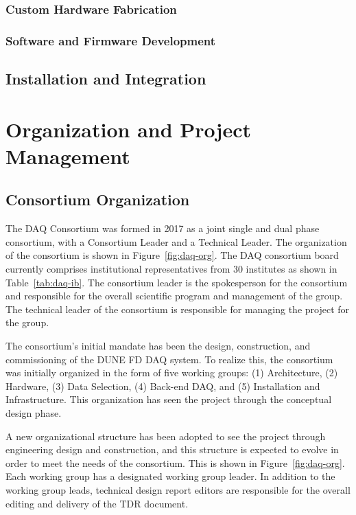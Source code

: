 \subsubsection{Custom Hardware Fabrication}

\subsubsection{Software and Firmware Development}

\subsection{Installation and Integration}

\section{Organization and Project Management}
\label{sec:daq:organization}

\subsection{Consortium Organization}

The DAQ Consortium was formed in 2017 as a joint single and dual phase
consortium, with a Consortium Leader and a Technical Leader.
The organization of the consortium is shown in Figure~\ref{fig:daq-org}.
The DAQ consortium board currently comprises institutional representatives from
30 institutes as shown in Table~\ref{tab:daq-ib}.
The consortium leader is the spokesperson for the consortium and responsible for
the overall scientific program and management of the group.
The technical leader of the consortium is responsible for managing the project
for the group.

The consortium's initial mandate has been the design, construction, and
commissioning of the DUNE FD DAQ system.
To realize this, the consortium was initially organized in the form of five
working groups: (1) Architecture, (2) Hardware, (3) Data Selection, (4) Back-end
DAQ, and (5) Installation and Infrastructure.
This organization has seen the project through the conceptual design phase.  

A new organizational structure has been adopted to see the project through
engineering design and construction, and this structure is expected to evolve in
order to meet the needs of the consortium.
This is shown in Figure~\ref{fig:daq-org}.
Each working group has a designated working group leader.
In addition to the working group leads, technical design report editors are
responsible for the overall editing and delivery of the TDR document.

